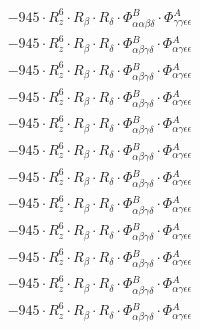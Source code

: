 \documentclass{article}
\begin{document}
\begin{subequations}
\begin{gather}
\begin{array}{c}
 \\[0.2em] 		 - 945 \cdot R_{z}^{6} \cdot R_{\beta{}} \cdot R_{\delta{}} \cdot \Phi{}^{B}_{\alpha{}\alpha{}\beta{}\delta{}} \cdot \Phi{}^{A}_{\gamma{}\gamma{}\epsilon{}\epsilon{}} 
 \\[0.2em] 		 - 945 \cdot R_{z}^{6} \cdot R_{\beta{}} \cdot R_{\delta{}} \cdot \Phi{}^{B}_{\alpha{}\beta{}\gamma{}\delta{}} \cdot \Phi{}^{A}_{\alpha{}\gamma{}\epsilon{}\epsilon{}} 
 \\[0.2em] 		 - 945 \cdot R_{z}^{6} \cdot R_{\beta{}} \cdot R_{\delta{}} \cdot \Phi{}^{B}_{\alpha{}\beta{}\gamma{}\delta{}} \cdot \Phi{}^{A}_{\alpha{}\gamma{}\epsilon{}\epsilon{}} 
 \\[0.2em] 		 - 945 \cdot R_{z}^{6} \cdot R_{\beta{}} \cdot R_{\delta{}} \cdot \Phi{}^{B}_{\alpha{}\beta{}\gamma{}\delta{}} \cdot \Phi{}^{A}_{\alpha{}\gamma{}\epsilon{}\epsilon{}} 
 \\[0.2em] 		 - 945 \cdot R_{z}^{6} \cdot R_{\beta{}} \cdot R_{\delta{}} \cdot \Phi{}^{B}_{\alpha{}\beta{}\gamma{}\delta{}} \cdot \Phi{}^{A}_{\alpha{}\gamma{}\epsilon{}\epsilon{}} 
 \\[0.2em] 		 - 945 \cdot R_{z}^{6} \cdot R_{\beta{}} \cdot R_{\delta{}} \cdot \Phi{}^{B}_{\alpha{}\beta{}\gamma{}\delta{}} \cdot \Phi{}^{A}_{\alpha{}\gamma{}\epsilon{}\epsilon{}} 
 \\[0.2em] 		 - 945 \cdot R_{z}^{6} \cdot R_{\beta{}} \cdot R_{\delta{}} \cdot \Phi{}^{B}_{\alpha{}\beta{}\gamma{}\delta{}} \cdot \Phi{}^{A}_{\alpha{}\gamma{}\epsilon{}\epsilon{}} 
 \\[0.2em] 		 - 945 \cdot R_{z}^{6} \cdot R_{\beta{}} \cdot R_{\delta{}} \cdot \Phi{}^{B}_{\alpha{}\beta{}\gamma{}\delta{}} \cdot \Phi{}^{A}_{\alpha{}\gamma{}\epsilon{}\epsilon{}} 
 \\[0.2em] 		 - 945 \cdot R_{z}^{6} \cdot R_{\beta{}} \cdot R_{\delta{}} \cdot \Phi{}^{B}_{\alpha{}\beta{}\gamma{}\delta{}} \cdot \Phi{}^{A}_{\alpha{}\gamma{}\epsilon{}\epsilon{}} 
 \\[0.2em] 		 - 945 \cdot R_{z}^{6} \cdot R_{\beta{}} \cdot R_{\delta{}} \cdot \Phi{}^{B}_{\alpha{}\beta{}\gamma{}\delta{}} \cdot \Phi{}^{A}_{\alpha{}\gamma{}\epsilon{}\epsilon{}} 
 \\[0.2em] 		 - 945 \cdot R_{z}^{6} \cdot R_{\beta{}} \cdot R_{\delta{}} \cdot \Phi{}^{B}_{\alpha{}\beta{}\gamma{}\delta{}} \cdot \Phi{}^{A}_{\alpha{}\gamma{}\epsilon{}\epsilon{}} 
 \\[0.2em] 		 - 945 \cdot R_{z}^{6} \cdot R_{\beta{}} \cdot R_{\delta{}} \cdot \Phi{}^{B}_{\alpha{}\beta{}\gamma{}\delta{}} \cdot \Phi{}^{A}_{\alpha{}\gamma{}\epsilon{}\epsilon{}} 

\end{array}
\end{gather}
\end{subequations}
\end{document}
